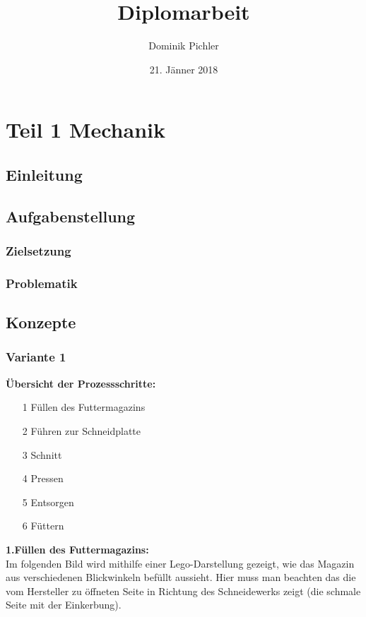 \documentclass[a4paper,12pt]{scrartcl}
\title{Diplomarbeit}
\author{Dominik Pichler}
\date{21. Jänner 2018}
\begin{document}
\maketitle
\tableofcontents
\setcounter{tocdepth}{3}

\section{Teil 1 Mechanik}
\subsection{Einleitung}
\subsection{Aufgabenstellung}
\subsubsection{Zielsetzung}
\subsubsection{Problematik}
\subsection{Konzepte} \newpage



\subsubsection{Variante 1} 
\textbf{Übersicht der Prozessschritte:}
\begin{itemize}
\item[1] Füllen des Futtermagazins
\item[2] Führen zur Schneidplatte
\item[3] Schnitt
\item[4] Pressen
\item[5] Entsorgen
\item[6] Füttern
\end{itemize}

\textbf{1.Füllen des Futtermagazins:} \\

Im folgenden Bild wird mithilfe einer Lego-Darstellung gezeigt, wie das Magazin aus verschiedenen Blickwinkeln befüllt aussieht. Hier muss man beachten das die vom Hersteller zu öffneten Seite in Richtung des Schneidewerks zeigt (die schmale Seite mit der Einkerbung).
\end{document}
